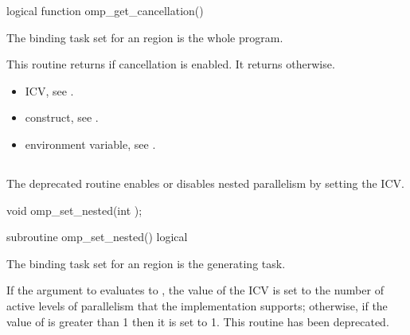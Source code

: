 \begin{fortranspecific}
\begin{ompfFunction}
logical function omp_get_cancellation()
\end{ompfFunction}
\end{fortranspecific}

\binding
The binding task set for an  region is the whole program.

\effect
This routine returns  if cancellation is enabled. It 
returns  otherwise.

\crossreferences
\begin{itemize}
\item {} ICV, see
.

\item {} construct, see .

\item {} environment variable, see
.
\end{itemize}



\subsection{}
\label{subsec:omp_set_nested}
\summary
The deprecated  routine enables or disables nested 
parallelism by setting the  ICV.


\format
\begin{ccppspecific}
\begin{ompcFunction}
void omp_set_nested(int );
\end{ompcFunction}
\end{ccppspecific}

\begin{fortranspecific}
\begin{ompfSubroutine}
subroutine omp_set_nested()
logical 
\end{ompfSubroutine}
\end{fortranspecific}

\binding
The binding task set for an  region is the generating task.

\effect
If the argument to  evaluates to , the value of
the  ICV is set to the number of active levels of
parallelism that the implementation supports; otherwise, if the value of
 is greater than 1 then it is set to 1.
This routine has been deprecated.


